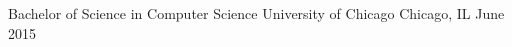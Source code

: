 
\begin{cventries}
  \cventry
    {Bachelor of Science in Computer Science} %
    {University of Chicago} %
    {Chicago, IL} %
    {June 2015} %
    {%
    }
\end{cventries}
